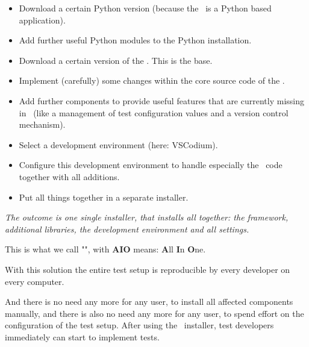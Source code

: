 \begin{itemize}
   \item Download a certain Python version (because the \rfwcore\ is a Python based application).
   \item Add further useful Python modules to the Python installation.
   \item Download a certain version of the \rfwcore. This is the base.
   \item Implement (carefully) some changes within the core source code of the \rfwcore.
   \item Add further components to provide useful features that are currently missing in \rfwcore\ (like a management of test configuration values
         and a version control mechanism).
   \item Select a development environment (here: VSCodium).
   \item Configure this development environment to handle especially the \rfwcore\ code together with all additions.
   \item Put all things together in a separate installer.
\end{itemize}

\textit{The outcome is one single installer, that installs all together: the framework, additional libraries, the development environment and all settings.}

\vspace{2ex}

This is what we call "\textbf{\rfw}", with \textbf{AIO} means: \textbf{A}ll \textbf{I}n \textbf{O}ne.

\vspace{2ex}

With this solution the entire test setup is reproducible by every developer on every computer.

And there is no need any more for any user, to install all affected components manually, and there is also no need any more for any user,
to spend effort on the configuration of the test setup. After using the \rfw\ installer, test developers immediately can start to implement tests.

